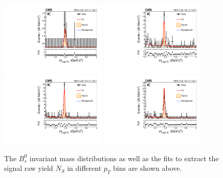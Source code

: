 \begin{figure}[h]
\begin{center}
\includegraphics[width= 0.45\textwidth]{Figures/Chapter5/data_PbPb_1_BptNew_710_doubly0_0_90EffInfoTreeFit.pdf}
\includegraphics[width= 0.45\textwidth]{Figures/Chapter5/data_PbPb_2_BptNew_1015_doubly0_0_90EffInfoTreeFit.pdf}
\includegraphics[width= 0.45\textwidth]{Figures/Chapter5/data_PbPb_3_BptNew_1520_doubly0_0_90EffInfoTreeFit.pdf}
\includegraphics[width= 0.45\textwidth]{Figures/Chapter5/data_PbPb_4_BptNew_2050_doubly0_0_90EffInfoTreeFit.pdf}
\caption{The $B^0_s$ invariant mass distributions as well as the fits to extract the signal raw yield $N_{S}$ in different $p_T$ bins are shown above.}
\label{BsMassPt}
\end{center}
\end{figure}

